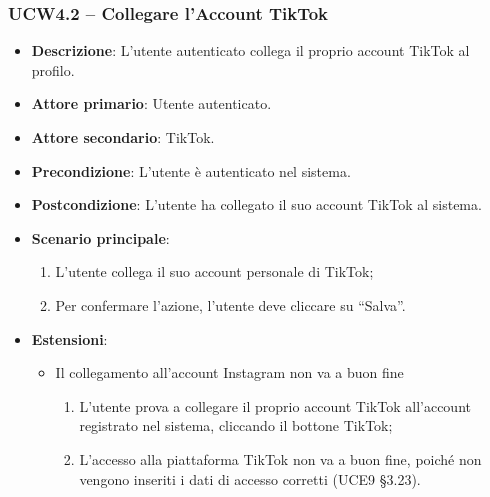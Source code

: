 \subsubsection{UCW4.2 – Collegare l'Account TikTok}
\begin{itemize}
\item \textbf{Descrizione}: L'utente autenticato collega il proprio account TikTok al profilo.
\item \textbf{Attore primario}: Utente autenticato.
\item \textbf{Attore secondario}: TikTok.
\item \textbf{Precondizione}: L’utente è autenticato nel sistema.
\item \textbf{Postcondizione}: L’utente ha collegato il suo account TikTok al sistema.

\item \textbf{Scenario principale}:
\begin{enumerate}
\item L’utente collega il suo account personale di TikTok;
\item Per confermare l’azione, l’utente deve cliccare su “Salva”. 
\end{enumerate}

\item \textbf{Estensioni}:
\begin{itemize}
\item Il collegamento all’account Instagram non va a buon fine
\begin{enumerate}
	\item L’utente prova a collegare il proprio account TikTok all’account registrato nel sistema, cliccando il bottone TikTok;
	\item L’accesso alla piattaforma TikTok non va a buon fine, poiché non vengono inseriti i dati di accesso corretti (UCE9 §3.23).
\end{enumerate}
\end{itemize}
\end{itemize}


